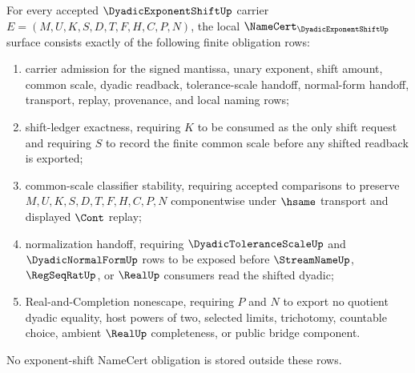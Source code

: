 \begin{theorem}
\label{thm:dyadic-exponent-shift-namecert-obligations}
For every accepted $\DyadicExponentShiftUp$ carrier $E=(M,U,K,S,D,T,F,H,C,P,N)$, the local $\NameCert_{\DyadicExponentShiftUp}$ surface consists exactly of the following finite obligation rows:
\begin{enumerate}
\item carrier admission for the signed mantissa, unary exponent, shift amount, common scale, dyadic readback, tolerance-scale handoff, normal-form handoff, transport, replay, provenance, and local naming rows;
\item shift-ledger exactness, requiring $K$ to be consumed as the only shift request and requiring $S$ to record the finite common scale before any shifted readback is exported;
\item common-scale classifier stability, requiring accepted comparisons to preserve $M,U,K,S,D,T,F,H,C,P,N$ componentwise under $\hsame$ transport and displayed $\Cont$ replay;
\item normalization handoff, requiring $\DyadicToleranceScaleUp$ and $\DyadicNormalFormUp$ rows to be exposed before $\StreamNameUp$, $\RegSeqRatUp$, or $\RealUp$ consumers read the shifted dyadic;
\item Real-and-Completion nonescape, requiring $P$ and $N$ to export no quotient dyadic equality, host powers of two, selected limits, trichotomy, countable choice, ambient $\RealUp$ completeness, or public bridge component.
\end{enumerate}
No exponent-shift NameCert obligation is stored outside these rows.
\end{theorem}
